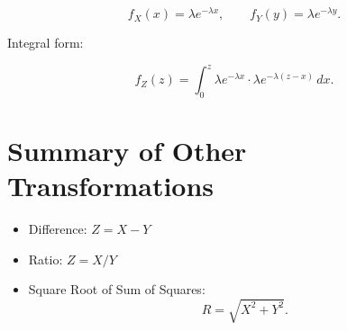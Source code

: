 \documentclass[11pt]{article}
\begin{document}
\[
f_X(x)=\lambda e^{-\lambda x},
\qquad
f_Y(y)=\lambda e^{-\lambda y}.
\]

Integral form:

\[
f_Z(z)=\int_0^z \lambda e^{-\lambda x}\cdot
\lambda e^{-\lambda(z-x)}\,dx.
\]


\section{Summary of Other Transformations}

\begin{itemize}
    \item Difference: $Z=X-Y$
    \item Ratio: $Z=X/Y$
    \item Square Root of Sum of Squares:
    \[
    R=\sqrt{X^2+Y^2}.
    \]
\end{itemize}

\end{document}

